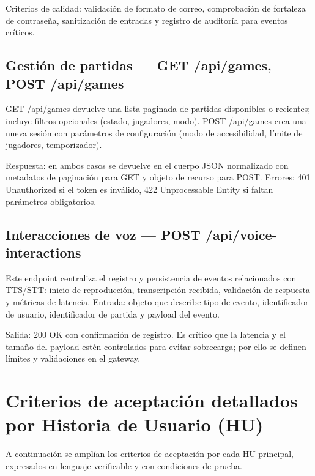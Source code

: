 \documentclass[12pt]{article}
\begin{document}
Criterios de calidad: validación de formato de correo, comprobación de fortaleza de contraseña, sanitización de entradas y registro de auditoría para eventos críticos.

\subsection{Gestión de partidas — GET /api/games, POST /api/games}
GET /api/games devuelve una lista paginada de partidas disponibles o recientes; incluye filtros opcionales (estado, jugadores, modo). POST /api/games crea una nueva sesión con parámetros de configuración (modo de accesibilidad, límite de jugadores, temporizador).

Respuesta: en ambos casos se devuelve en el cuerpo JSON normalizado con metadatos de paginación para GET y objeto de recurso para POST. Errores: 401 Unauthorized si el token es inválido, 422 Unprocessable Entity si faltan parámetros obligatorios.

\subsection{Interacciones de voz — POST /api/voice-interactions}
Este endpoint centraliza el registro y persistencia de eventos relacionados con TTS/STT: inicio de reproducción, transcripción recibida, validación de respuesta y métricas de latencia. Entrada: objeto que describe tipo de evento, identificador de usuario, identificador de partida y payload del evento.

Salida: 200 OK con confirmación de registro. Es crítico que la latencia y el tamaño del payload estén controlados para evitar sobrecarga; por ello se definen límites y validaciones en el gateway.

\section{Criterios de aceptación detallados por Historia de Usuario (HU)}
A continuación se amplían los criterios de aceptación por cada HU principal, expresados en lenguaje verificable y con condiciones de prueba.
\end{document}
